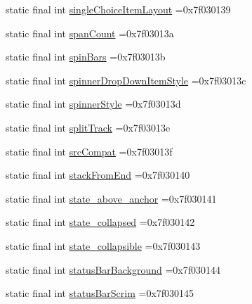 \begin{DoxyCompactItemize}
\item 
static final int \mbox{\hyperlink{classbr_1_1unb_1_1cic_1_1mp_1_1marketmaster_1_1R_1_1attr_a067c05fbb6b37c416fd2c4c25867f883}{single\+Choice\+Item\+Layout}} =0x7f030139
\item 
static final int \mbox{\hyperlink{classbr_1_1unb_1_1cic_1_1mp_1_1marketmaster_1_1R_1_1attr_a63a7b19d7f8872a99f9b76b1d111e77c}{span\+Count}} =0x7f03013a
\item 
static final int \mbox{\hyperlink{classbr_1_1unb_1_1cic_1_1mp_1_1marketmaster_1_1R_1_1attr_a940239015edad0744ede8a8b18052c4f}{spin\+Bars}} =0x7f03013b
\item 
static final int \mbox{\hyperlink{classbr_1_1unb_1_1cic_1_1mp_1_1marketmaster_1_1R_1_1attr_a08a69ad2ff11bf920fe12d8580b33b38}{spinner\+Drop\+Down\+Item\+Style}} =0x7f03013c
\item 
static final int \mbox{\hyperlink{classbr_1_1unb_1_1cic_1_1mp_1_1marketmaster_1_1R_1_1attr_a1b0b8740494d4a3c58222b953d8ab3a0}{spinner\+Style}} =0x7f03013d
\item 
static final int \mbox{\hyperlink{classbr_1_1unb_1_1cic_1_1mp_1_1marketmaster_1_1R_1_1attr_a83f0f35668e731300fa2f0b2a21ce6dd}{split\+Track}} =0x7f03013e
\item 
static final int \mbox{\hyperlink{classbr_1_1unb_1_1cic_1_1mp_1_1marketmaster_1_1R_1_1attr_a1503b17bc9f3a1098852e84fd1d9d962}{src\+Compat}} =0x7f03013f
\item 
static final int \mbox{\hyperlink{classbr_1_1unb_1_1cic_1_1mp_1_1marketmaster_1_1R_1_1attr_a46a81821dcb9250df8e9d4e93e36293f}{stack\+From\+End}} =0x7f030140
\item 
static final int \mbox{\hyperlink{classbr_1_1unb_1_1cic_1_1mp_1_1marketmaster_1_1R_1_1attr_a501e394ab69e7fe363196f473bcb6a3d}{state\+\_\+above\+\_\+anchor}} =0x7f030141
\item 
static final int \mbox{\hyperlink{classbr_1_1unb_1_1cic_1_1mp_1_1marketmaster_1_1R_1_1attr_a5aff80f0e609eeb3af5f15a2718147a7}{state\+\_\+collapsed}} =0x7f030142
\item 
static final int \mbox{\hyperlink{classbr_1_1unb_1_1cic_1_1mp_1_1marketmaster_1_1R_1_1attr_aa9ce45908dcbcb3df9d9fa8176efce6a}{state\+\_\+collapsible}} =0x7f030143
\item 
static final int \mbox{\hyperlink{classbr_1_1unb_1_1cic_1_1mp_1_1marketmaster_1_1R_1_1attr_a898544aa9f6e3e4091f190f0cc1a4d55}{status\+Bar\+Background}} =0x7f030144
\item 
static final int \mbox{\hyperlink{classbr_1_1unb_1_1cic_1_1mp_1_1marketmaster_1_1R_1_1attr_a959e4bc32a3f1645ed04f74fc5fcdc18}{status\+Bar\+Scrim}} =0x7f030145

\end{DoxyCompactItemize}
